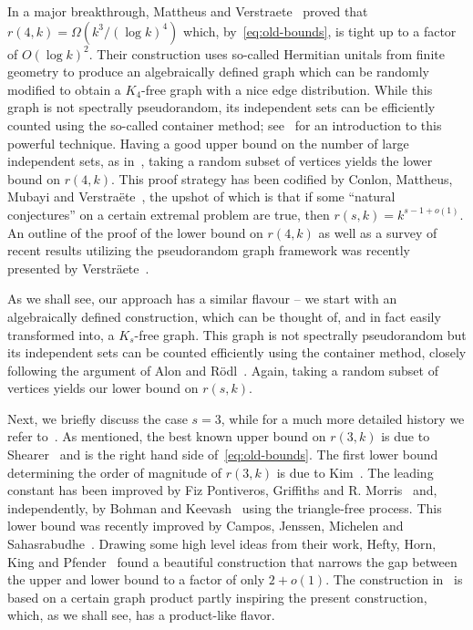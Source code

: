 \documentclass{article}
\theoremstyle{plain}
\theoremstyle{definition}
\begin{document}
In a major breakthrough, Mattheus and Verstraete~\cite{mattheus-verstraete} proved that $r(4,k) = \Omega(k^3 / (\log k)^4)$ which, by~\eqref{eq:old-bounds}, is tight up to a factor of $O(\log k)^2$. Their construction uses so-called Hermitian unitals from finite geometry to produce an algebraically defined graph which can be randomly modified to obtain a $K_4$-free graph with a nice edge distribution. While this graph is not spectrally pseudorandom, its independent sets can be efficiently counted using the so-called container method; see~\cite{samotij-survey} for an introduction to this powerful technique. Having a good upper bound on the number of large independent sets, as in~\cite{mubayi-verstraete}, taking a random subset of vertices yields the lower bound on $r(4, k)$. This proof strategy has been codified by Conlon, Mattheus, Mubayi and Verstra\"{e}te~\cite{CMMV-zarankiewicz}, the upshot of which is that if some ``natural conjectures'' on a certain extremal problem are true, then $r(s, k) = k^{s-1 + o(1)}$. An outline of the proof of the lower bound on $r(4, k)$ as well as a survey of recent results utilizing the pseudorandom graph framework was recently presented by Verstr\"{a}ete~\cite{verstraete-survey}.

As we shall see, our approach has a similar flavour -- we start with an algebraically defined construction, which can be thought of, and in fact easily transformed into, a $K_s$-free graph. This graph is not spectrally pseudorandom but its independent sets can be counted efficiently using the container method, closely following the argument of Alon and R\"{o}dl~\cite{alon-rodl}. Again, taking a random subset of vertices yields our lower bound on $r(s, k)$.

Next, we briefly discuss the case $s=3$, while for a much more detailed history we refer to~\cite{CJMSk3}. As mentioned, the best known upper bound on $r(3, k)$ is due to Shearer~\cite{shearer} and is the right hand side of~\eqref{eq:old-bounds}. The first lower bound determining the order of magnitude of $r(3, k)$ is due to Kim~\cite{kim}. The leading constant has been improved by Fiz Pontiveros, Griffiths and R. Morris~\cite{fizpontiveros} and, independently, by Bohman and Keevash~\cite{bohman-keevash-K3} using the triangle-free process. This lower bound was recently improved by Campos, Jenssen, Michelen and Sahasrabudhe~\cite{CJMSk3}. Drawing some high level ideas from their work, Hefty, Horn, King and Pfender~\cite{heftyhorn} found a beautiful construction that narrows the gap between the upper and lower bound to a factor of only $2 + o(1)$. The construction in~\cite{heftyhorn} is based on a certain graph product partly inspiring the present construction, which, as we shall see, has a product-like flavor.
\end{document}
